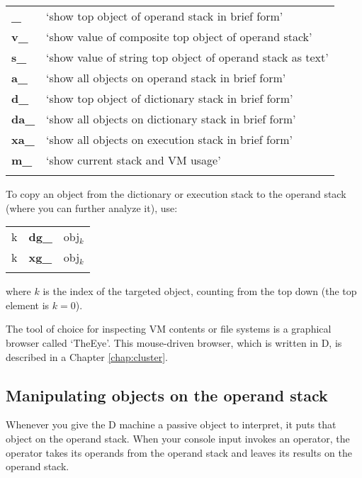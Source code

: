 \begin{tabular}{>{\sffamily\bfseries}l>{\normalfont}l}
\_   & `show top object of operand stack in brief form'\\
v\_  & `show value of composite top object of operand stack'\\
s\_  & `show value of string top object of operand stack as text'\\
a\_  & `show all objects on operand stack in brief form'\\
d\_  & `show top object of dictionary stack in brief form'\\
da\_ & `show all objects on dictionary stack in brief form'\\
xa\_ & `show all objects on execution stack in brief form'\\
m\_  & `show current stack and VM usage'\\\\
\end{tabular}


To copy an object from the dictionary or execution stack to the operand stack (where you can further analyze it), use:\\

\begin{tabular}{>{\sffamily}r>{\sffamily\bfseries}l>{\sffamily}l}
k & dg\_ & obj$_k$\\
k & xg\_ & obj$_k$\\\\
\end{tabular}


\noindent where $k$ is the index of the targeted object, counting from the top down (the top element is $k=0$).

The tool of choice for inspecting VM contents or file systems is a graphical browser called `TheEye'. This mouse-driven browser, which is written in D, is described in a Chapter \ref{chap:cluster}. 

\subsection{Manipulating objects on the operand stack}

Whenever you give the D machine a passive object to interpret, it puts that object on the operand stack. When your console input invokes an operator, the operator takes its operands from the operand stack and leaves its results on the operand stack.

